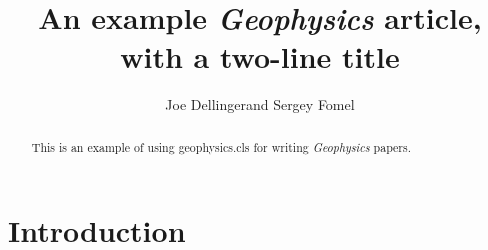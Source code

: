 \documentclass[paper,revised]{geophysics}
\begin{document}
\title{An example \emph{Geophysics} article, \\ with a two-line title}

\renewcommand{\thefootnote}{\fnsymbol{footnote}} 


\address{
\footnotemark[1]BP UTG, \\
200 Westlake Park Blvd, \\
Houston, TX, 77079 \\
\footnotemark[2]Bureau of Economic Geology, \\
John A. and Katherine G. Jackson School of Geosciences \\
The University of Texas at Austin \\
University Station, Box X \\
Austin, TX 78713-8924}
\author{Joe Dellinger\footnotemark[1] and Sergey Fomel\footnotemark[2]}


\maketitle

\begin{abstract}
  This is an example of using \textsf{geophysics.cls} for writing
  \emph{Geophysics} papers.
\end{abstract}

\section{Introduction}
\end{document}
